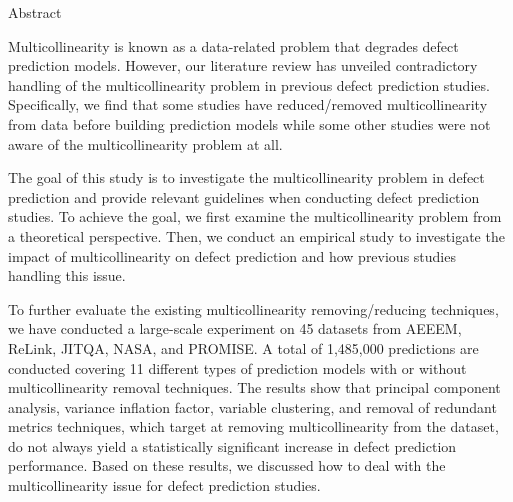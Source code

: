 
\newcommand{\abstractEN}[1]{\normalsize #1 \par}
\newcommand{\abstractKR}[1]{\normalsize #1 \par}

\fontsize{14}{18} \selectfont Abstract \par
{}

\bigskip
\abstractEN{
Multicollinearity is known as a data-related problem that degrades defect prediction models. However, our literature review has unveiled contradictory handling of the multicollinearity problem in previous defect prediction studies. Specifically, we find that some studies have reduced/removed multicollinearity from data before building prediction models while some other studies were not aware of the multicollinearity problem at all. 

The goal of this study is to investigate the multicollinearity problem in defect prediction and provide relevant guidelines when conducting defect prediction studies. To achieve the goal, we first examine the multicollinearity problem from a theoretical perspective. Then, we conduct an empirical study to investigate the impact of multicollinearity on defect prediction and how previous studies handling this issue. 

To further evaluate the existing multicollinearity removing/reducing techniques, we have conducted a large-scale experiment on 45 datasets from AEEEM, ReLink, JIT\textunderscore QA, NASA, and PROMISE. A total of 1,485,000 predictions are conducted covering 11 different types of prediction models with or without multicollinearity removal techniques. The results show that principal component analysis, variance inflation factor, variable clustering, and removal of redundant metrics techniques, which target at removing multicollinearity from the dataset, do not always yield a statistically significant increase in defect prediction performance. Based on these results, we discussed how to deal with the multicollinearity issue for defect prediction studies.
}
\bigskip
\bigskip

